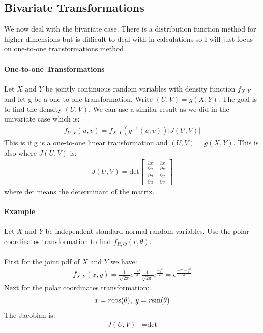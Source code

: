\documentclass[,oneside]{article}
\begin{document}
\begin{enumerate}
\subsection{Bivariate Transformations}
We now deal with the bivariate case. There is a distribution function method for higher dimensions but is difficult to deal with in calculations so I will just focus on one-to-one transformations method.\\ \\
\textbf{One-to-one Transformations}\\ \\
Let $X$ and $Y$ be jointly continuous random variables with density function $f_{X,Y}$ and let g be a one-to-one transformation. Write $(U,V)=g(X,Y)$. The goal is to find the density $(U,V)$. We can use a similar result as we did in the univariate case which is:
\begin{align*}
f_{U,V}(u,v)=f_{X,Y}(g^{-1}(u,v)) | J(U,V) |
\end{align*}
This is if g is a one-to-one linear transformation and $(U,V)=g(X,Y)$. This is also where $J(U,V)$ is:
\begin{align*}
J(U,V) = \text{det}
\begin{bmatrix}
\frac{\partial x}{\partial u} & \frac{\partial x}{\partial v}\\
\frac{\partial y}{\partial u} & \frac{\partial y}{\partial v}
\end{bmatrix}
\end{align*}
where det means the determinant of the matrix.\\ \\
\textbf{Example}\\ \\
Let $X$ and $Y$ be independent standard normal random variables. Use the polar coordinates transformation to find $f_{R,\Theta}(r,\theta)$.\\ \\
First for the joint pdf of $X$ and $Y$ we have:
\begin{align*}
f_{X,Y}(x,y)=\frac{1}{\sqrt{2\pi}}e^{\frac{-x^2}{2}}\frac{1}{\sqrt{2\pi}}e^{\frac{-y^2}{2}}=e^{\frac{-x^2-y^2}{2}}
\end{align*}
Next for the polar coordinates transformation:
\begin{align*}
x=r \text{cos}(\theta ),\hspace{0.1cm} y=r\text{sin}(\theta )
\end{align*}
The Jacobian is:
\begin{align*}
J(U,V) &= \text{det}

\end{align*}
\end{enumerate}
\end{document}
